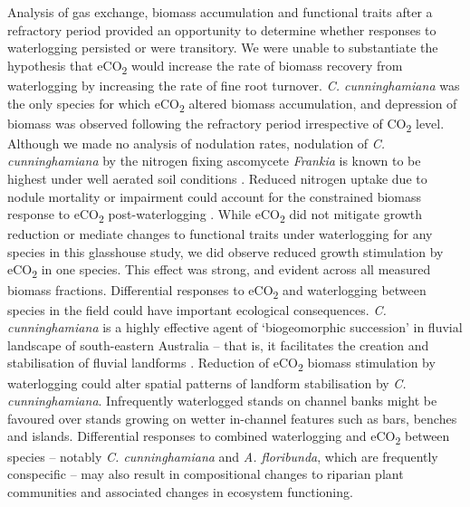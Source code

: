 \documentclass[12pt,a4paper]{memoir}
\begin{document}
Analysis of gas exchange, biomass accumulation and functional traits after a refractory period provided an opportunity to determine whether responses to waterlogging persisted or were transitory. We were unable to substantiate the hypothesis that eCO\textsubscript{2} would increase the rate of biomass recovery from waterlogging by increasing the rate of fine root turnover. \textit{C. cunninghamiana} was the only species for which eCO\textsubscript{2} altered biomass accumulation, and depression of biomass was observed following the refractory period irrespective of CO\textsubscript{2} level. Although we made no analysis of nodulation rates, nodulation of \textit{C. cunninghamiana} by the nitrogen fixing ascomycete \textit{Frankia} is known to be highest under well aerated soil conditions \citep{Dawson1989}. Reduced nitrogen uptake due to nodule mortality or impairment could account for the constrained biomass response to eCO\textsubscript{2} post-waterlogging \citep{Reich2006}. While eCO\textsubscript{2} did not mitigate growth reduction or mediate changes to functional traits under waterlogging for any species in this glasshouse study, we did observe reduced growth stimulation by eCO\textsubscript{2} in one species. This effect was strong, and evident across all measured biomass fractions. Differential responses to eCO\textsubscript{2} and waterlogging between species in the field could have important ecological consequences. \textit{C. cunninghamiana} is a highly effective agent of ‘biogeomorphic succession’ in fluvial landscape of south-eastern Australia – that is, it facilitates the creation and stabilisation of fluvial landforms \citep{Erskine2009}. Reduction of eCO\textsubscript{2} biomass stimulation by waterlogging could alter spatial patterns of landform stabilisation by \textit{C. cunninghamiana}. Infrequently waterlogged stands on channel banks might be favoured over stands growing on wetter in-channel features such as bars, benches and islands. Differential responses to combined waterlogging and eCO\textsubscript{2} between species – notably \textit{C. cunninghamiana} and \textit{A. floribunda}, which are frequently conspecific – may also result in compositional changes to riparian plant communities and associated changes in ecosystem functioning.
\end{document}
